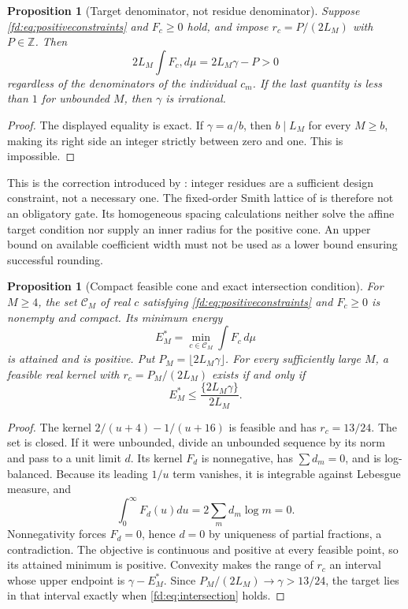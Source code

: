 \documentclass[11pt,a4paper]{article}
\newcommand{\Z}{\mathbb Z}
\newtheorem{proposition}[theorem]{Proposition}
\theoremstyle{definition}
\theoremstyle{remark}
\numberwithin{equation}{section}
\begin{document}
\begin{proposition}[Target denominator, not residue denominator]
\label{fd:prop:residues}
Suppose \eqref{fd:eq:positiveconstraints} and $F_c\ge0$ hold, and impose
$r_c=P/(2L_M)$ with $P\in\Z$.  Then
\[
 2L_M\int F_c,d\mu=2L_M\gamma-P>0
\]
regardless of the denominators of the individual $c_m$.  If the last
quantity is less than $1$ for unbounded $M$, then $\gamma$ is irrational.
\end{proposition}
\begin{proof}
The displayed equality is exact.  If $\gamma=a/b$, then $b\mid L_M$
for every $M\ge b$, making its right side an integer strictly between
zero and one.  This is impossible.
\end{proof}

This is the correction introduced by \cite{fd:positivev2}: integer
residues are a sufficient design constraint, not a necessary one.  The
fixed-order Smith lattice of \cite{fd:multiscale} is therefore not an
obligatory gate.  Its homogeneous spacing calculations neither solve the
affine target condition nor supply an inner radius for the positive cone.
An upper bound on available coefficient width must not be used as a
lower bound ensuring successful rounding.

\begin{proposition}[Compact feasible cone and exact intersection condition]
\label{fd:prop:compact}
For $M\ge4$, the set $\mathcal C_M$ of real $c$ satisfying
\eqref{fd:eq:positiveconstraints} and $F_c\ge0$ is nonempty and compact.
Its minimum energy
\[
 E_M^*=\min_{c\in\mathcal C_M}\int F_c\,d\mu
\]
is attained and is positive.  Put $P_M=\lfloor2L_M\gamma\rfloor$.
For every sufficiently large $M$, a feasible real kernel with
$r_c=P_M/(2L_M)$ exists if and only if
\begin{equation}\label{fd:eq:intersection}
 E_M^*\le\frac{\{2L_M\gamma\}}{2L_M}.
\end{equation}
\end{proposition}
\begin{proof}
The kernel $2/(u+4)-1/(u+16)$ is feasible and has $r_c=13/24$.
The set is closed.  If it were unbounded, divide an unbounded sequence
by its norm and pass to a unit limit $d$.  Its kernel $F_d$ is
nonnegative, has $\sum d_m=0$, and is log-balanced.  Because its leading
$1/u$ term vanishes, it is integrable against Lebesgue measure, and
\[
 \int_0^\infty F_d(u)du=2\sum_m d_m\log m=0.
\]
Nonnegativity forces $F_d=0$, hence $d=0$ by uniqueness of partial
fractions, a contradiction.  The objective is continuous and positive
at every feasible point, so its attained minimum is positive.
Convexity makes the range of $r_c$ an interval whose upper endpoint is
$\gamma-E_M^*$.  Since $P_M/(2L_M)\to\gamma>13/24$, the target lies in
that interval exactly when \eqref{fd:eq:intersection} holds.
\end{proof}
\end{document}
